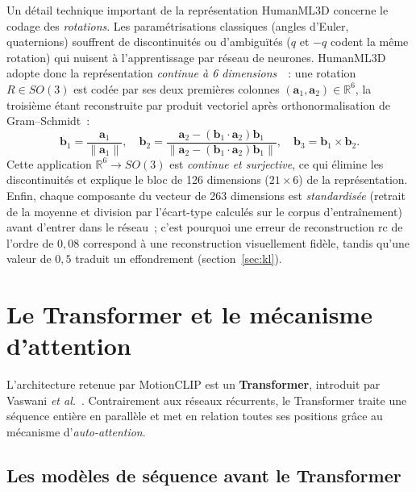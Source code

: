 \documentclass[12pt,a4paper,oneside]{report}
\theoremstyle{definition}
\theoremstyle{plain}
\newcommand{\rc}{\mathrm{rc}}
\newcommand{\R}{\mathbb{R}}
\begin{document}
Un détail technique important de la représentation HumanML3D concerne le codage
des \emph{rotations}. Les paramétrisations classiques (angles d'Euler,
quaternions) souffrent de discontinuités ou d'ambiguïtés
($q$ et $-q$ codent la même rotation) qui nuisent à l'apprentissage par réseau de
neurones. HumanML3D adopte donc la représentation \emph{continue à 6 dimensions}~\cite{zhou2019continuity}~:
une rotation $R\in SO(3)$ est codée par ses deux premières colonnes
$(\mathbf{a}_1,\mathbf{a}_2)\in\R^6$, la troisième étant reconstruite par produit
vectoriel après orthonormalisation de Gram--Schmidt~:
\begin{equation}
\mathbf{b}_1 = \frac{\mathbf{a}_1}{\lVert\mathbf{a}_1\rVert},\quad
\mathbf{b}_2 = \frac{\mathbf{a}_2 - (\mathbf{b}_1\!\cdot\!\mathbf{a}_2)\mathbf{b}_1}
{\lVert\mathbf{a}_2 - (\mathbf{b}_1\!\cdot\!\mathbf{a}_2)\mathbf{b}_1\rVert},\quad
\mathbf{b}_3 = \mathbf{b}_1\times\mathbf{b}_2 .
\end{equation}
Cette application $\R^6\to SO(3)$ est \emph{continue et surjective}, ce qui élimine
les discontinuités et explique le bloc de 126 dimensions ($21\times6$) de la
représentation. Enfin, chaque composante du vecteur de 263 dimensions est
\emph{standardisée} (retrait de la moyenne et division par l'écart-type calculés
sur le corpus d'entraînement) avant d'entrer dans le réseau~; c'est pourquoi une
erreur de reconstruction $\rc$ de l'ordre de $0{,}08$ correspond à une
reconstruction visuellement fidèle, tandis qu'une valeur de $0{,}5$ traduit un
effondrement (section~\ref{sec:kl}).

\section{Le Transformer et le mécanisme d'attention}
\label{sec:transfo}

L'architecture retenue par MotionCLIP est un \textbf{Transformer}, introduit par
Vaswani \emph{et al.}~\cite{vaswani2017attention}. Contrairement aux réseaux
récurrents, le Transformer traite une séquence entière en parallèle et met en
relation toutes ses positions grâce au mécanisme d'\emph{auto-attention}.

\subsection{Les modèles de séquence avant le Transformer}
\end{document}

